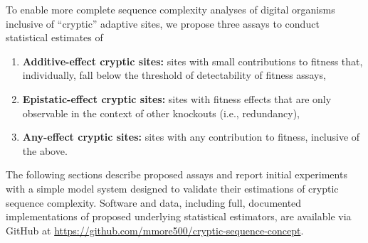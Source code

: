 



To enable more complete sequence complexity analyses of digital organisms inclusive of ``cryptic'' adaptive sites, we propose three assays to conduct statistical estimates of
\begin{enumerate}
\item \textbf{Additive-effect cryptic sites:} sites with small contributions to fitness that, individually, fall below the threshold of detectability of fitness assays,
\item \textbf{Epistatic-effect cryptic sites:} sites with fitness effects that are only observable in the context of other knockouts (i.e., redundancy),
\item \textbf{Any-effect cryptic sites:} sites with any contribution to fitness, inclusive of the above.
\end{enumerate}

The following sections describe proposed assays and report initial experiments with a simple model system designed to validate their estimations of cryptic sequence complexity.
Software and data, including full, documented implementations of proposed underlying statistical estimators, are available via GitHub at \url{https://github.com/mmore500/cryptic-sequence-concept}.
